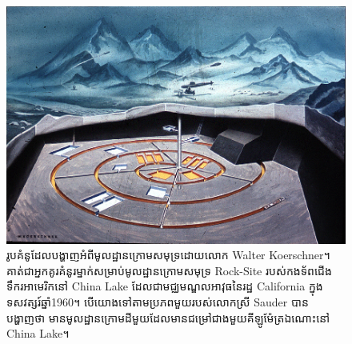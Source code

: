 \documentclass[10pt,twocolumn,letterpaper]{article}
\begin{document}
\begin{figure}[t]
\begin{center}
   \includegraphics[width=1\linewidth]{undersea.jpg}
\end{center}
   \caption{រូបគំនូដែលបង្ហាញអំពីមូលដ្ឋានក្រោមសមុទ្រដោយលោក Walter Koerschner។ គាត់ជាអ្នកគូរគំនូរម្នាក់សម្រាប់មូលដ្ឋានក្រោមសមុទ្រ Rock-Site របស់កងទ័ពជើងទឹករអាមេរិកនៅ China Lake ដែលជាមជ្ឈមណ្ឌលអាវុធនៃរដ្ឋ California ក្នុងទសវត្សរ៍ឆ្នាំ1960។ បើយោងទៅតាមប្រភពមួយរបស់លោកស្រី Sauder បានបង្ហាញថា មានមូលដ្ឋានក្រោមដីមួយដែលមានជម្រៅជាងមួយគីឡូម៉ែត្រឯណោះនៅ China Lake\cite{22,23}។}
\label{fig:5}
\label{fig:onecol}
\end{figure}
\end{document}
